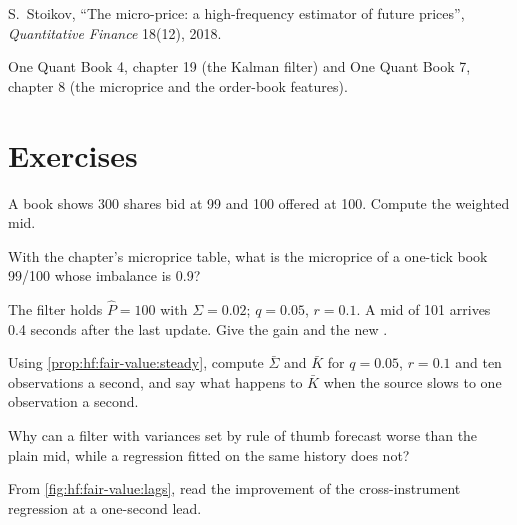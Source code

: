 \begin{omsources}
\item S.~Stoikov, ``The micro-price: a high-frequency estimator of future prices'', \emph{Quantitative Finance} 18(12), 2018.
\item One Quant Book 4, chapter 19 (the Kalman filter) and One Quant Book 7, chapter 8 (the microprice and the order-book features).
\end{omsources}

\section{Exercises}

\begin{exercise}[$\star$]\label{exo:hf:fair-value:1}
A book shows 300 shares bid at 99 and 100 offered at 100. Compute the weighted mid.
\end{exercise}

\begin{exercise}[$\star$]\label{exo:hf:fair-value:2}
With the chapter's microprice table, what is the microprice of a one-tick book 99/100 whose imbalance is 0.9?
\end{exercise}

\begin{exercise}[$\star$]\label{exo:hf:fair-value:3}
The filter holds $\hat P=100$ with $\Sigma=0.02$; $q=0.05$, $r=0.1$. A mid of 101 arrives 0.4 seconds after the last update. Give the gain and the new
.
\end{exercise}

\begin{exercise}[$\star\star$]\label{exo:hf:fair-value:4}
Using \cref{prop:hf:fair-value:steady}, compute $\bar\Sigma$ and $\bar K$ for $q=0.05$, $r=0.1$ and ten observations a second, and say what
happens to $\bar K$ when the source slows to one observation a second.
\end{exercise}

\begin{exercise}[$\star\star$]\label{exo:hf:fair-value:5}
Why can a filter with variances set by rule of thumb forecast worse than the plain mid, while a regression fitted on the same history does not?
\end{exercise}

\begin{exercise}[$\star\star$]\label{exo:hf:fair-value:6}
From \cref{fig:hf:fair-value:lags}, read the improvement of the cross-instrument regression at a one-second lead.
\end{exercise}

